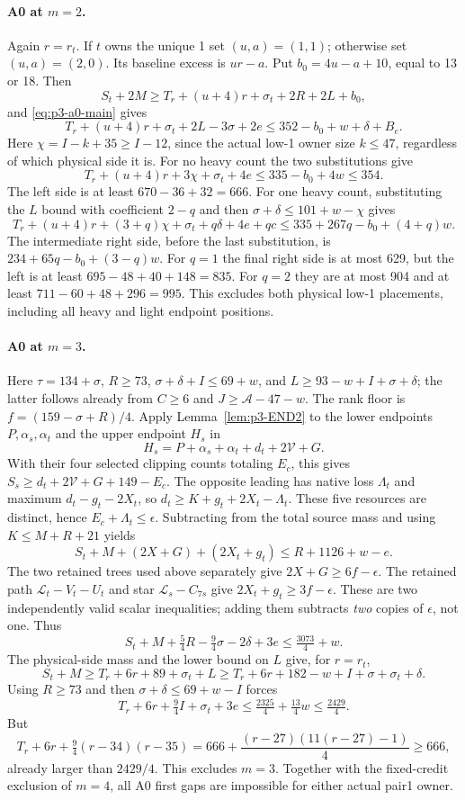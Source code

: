 \documentclass[11pt,letterpaper]{article}
\theoremstyle{definition}\newtheorem{definition}[theorem]{Definition}
\begin{document}
\paragraph{A0 at $m=2$.}
Again $r=r_t$. If $t$ owns the unique 1 set $(u,a)=(1,1)$;
otherwise set $(u,a)=(2,0)$. Its baseline excess is $ur-a$.
Put $b_0=4u-a+10$, equal to 13 or 18. Then
\[
S_t+2M\ge T_r+(u+4)r+\sigma_t+2R+2L+b_0,
\]
and \eqref{eq:p3-a0-main} gives
\[
T_r+(u+4)r+\sigma_t+2L-3\sigma+2e
\le352-b_0+w+\delta+B_e.
\]
Here $\chi=I-k+35\ge I-12$, since the actual low-1 owner size
$k\le47$, regardless of which physical side it is.
For no heavy count the two substitutions give
\[
T_r+(u+4)r+3\chi+\sigma_t+4e
\le335-b_0+4w\le354.
\]
The left side is at least $670-36+32=666$.
For one heavy count, substituting the $L$ bound with coefficient $2-q$
and then $\sigma+\delta\le101+w-\chi$ gives
\begin{equation}\label{eq:p3-a0-m2-heavy}
T_r+(u+4)r+(3+q)\chi+\sigma_t+q\delta+4e+qc
\le335+267q-b_0+(4+q)w.
\end{equation}
The intermediate right side, before the last substitution, is
$234+65q-b_0+(3-q)w$. For $q=1$ the final right side is at most
629, but the left is at least $695-48+40+148=835$.
For $q=2$ they are at most 904 and at least
$711-60+48+296=995$. This excludes both physical low-1 placements,
including all heavy and light endpoint positions.

\paragraph{A0 at $m=3$.}
Here $\tau=134+\sigma$, $R\ge73$,
$\sigma+\delta+I\le69+w$, and
$L\ge93-w+I+\sigma+\delta$; the latter follows already from
$C\ge6$ and $J\ge\mathcal A-47-w$.
The rank floor is $f=(159-\sigma+R)/4$.
Apply Lemma~\ref{lem:p3-END2} to the lower endpoints $P,\alpha_s,\alpha_t$
and the upper endpoint $H_s$ in
\[
H_s=P+\alpha_s+\alpha_t+d_t+2\mathcal V+G.
\]
With their four selected clipping counts totaling $E_c$, this gives
$S_s\ge d_t+2\mathcal V+G+149-E_c$.
The opposite leading has native loss $\Lambda_t$ and maximum
$d_t-g_t-2X_t$, so $d_t\ge K+g_t+2X_t-\Lambda_t$.
These five resources are distinct, hence $E_c+\Lambda_t\le\epsilon$.
Subtracting from the total source mass and using $K\le M+R+21$ yields
\[
S_t+M+(2X+G)+(2X_t+g_t)\le R+1126+w-e.
\]
The two retained trees used above separately give
$2X+G\ge6f-\epsilon$.
The retained path $\mathcal L_t-V_t-U_t$ and star
$\mathcal L_s-C_{7s}$ give $2X_t+g_t\ge3f-\epsilon$.
These are two independently valid scalar inequalities; adding them
subtracts \emph{two} copies of $\epsilon$, not one. Thus
\[
S_t+M+\tfrac54R-\tfrac94\sigma-2\delta+3e
\le\tfrac{3073}{4}+w.
\]
The physical-side mass and the lower bound on $L$ give, for $r=r_t$,
\[
S_t+M\ge T_r+6r+89+\sigma_t+L
\ge T_r+6r+182-w+I+\sigma+\sigma_t+\delta.
\]
Using $R\ge73$ and then $\sigma+\delta\le69+w-I$ forces
\[
T_r+6r+\tfrac94I+\sigma_t+3e
\le\tfrac{2325}{4}+\tfrac{13}{4}w\le\tfrac{2429}{4}.
\]
But
\[
T_r+6r+\tfrac94(r-34)(r-35)
=666+\frac{(r-27)(11(r-27)-1)}4\ge666,
\]
already larger than $2429/4$. This excludes $m=3$. Together with the
fixed-credit exclusion of $m=4$, all A0 first gaps are impossible for
either actual pair1 owner.
\end{document}
